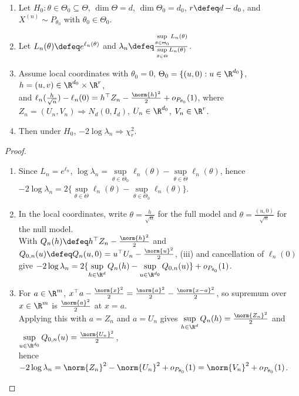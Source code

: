 \begin{theorem} \label{thm:wilks-likelihood-ratio-chi-square} 
\begin{enumerate}[label=(\roman*)]
\setlength{\itemsep}{0pt}
\item Let $H_0:\theta\in\Theta_0\subseteq\Theta$, $\dim\Theta=d$, $\dim\Theta_0=d_0$, $r\defeq d-d_0$, and $X^{(n)}\sim P_{\theta_0}$ with $\theta_0\in\Theta_0$.
\item Let $L_n(\theta)\defeq e^{\ell_n(\theta)}$ and $\lambda_n\defeq\frac{\sup\limits_{\theta\in\Theta_0}L_n(\theta)}{\sup\limits_{\theta\in\Theta}L_n(\theta)}$.
\item Assume local coordinates with $\theta_0=0$, $\Theta_0=\{(u,0):u\in\R^{d_0}\}$, $h=(u,v)\in\R^{d_0}\times\R^r$,\\
and $\ell_n(\frac{h}{\sqrt n})-\ell_n(0)=h^\top Z_n-\frac{\norm{h}^2}{2}+o_{P_{\theta_0}}(1)$, where $Z_n=(U_n,V_n)\Rightarrow N_d(0,I_d)$, $U_n\in\R^{d_0}$, $V_n\in\R^r$.
\item
Then under $H_0$, $-2\log\lambda_n\Rightarrow\chi_r^2$.
\end{enumerate}
\begin{proof}
\begin{enumerate}[label=(\roman*)]
\setlength{\itemsep}{0pt}
\item Since $L_n=e^{\ell_n}$, $\log\lambda_n=\sup\limits_{\theta\in\Theta_0}\ell_n(\theta)-\sup\limits_{\theta\in\Theta}\ell_n(\theta)$, hence $-2\log\lambda_n=2\{\sup\limits_{\theta\in\Theta}\ell_n(\theta)-\sup\limits_{\theta\in\Theta_0}\ell_n(\theta)\}$.
\item In the local coordinates, write $\theta=\frac{h}{\sqrt n}$ for the full model and $\theta=\frac{(u,0)}{\sqrt n}$ for the null model.\\
With $Q_n(h)\defeq h^\top Z_n-\frac{\norm{h}^2}{2}$ and $Q_{0,n}(u)\defeq Q_n(u,0)=u^\top U_n-\frac{\norm{u}^2}{2}$, (iii) and cancellation of $\ell_n(0)$ give $-2\log\lambda_n=2\{\sup\limits_{h\in\R^d}Q_n(h)-\sup\limits_{u\in\R^{d_0}}Q_{0,n}(u)\}+o_{P_{\theta_0}}(1)$.
\item For $a\in\R^m$, $x^\top a-\frac{\norm{x}^2}{2}=\frac{\norm{a}^2}{2}-\frac{\norm{x-a}^2}{2}$, so supremum over $x\in\R^m$ is $\frac{\norm{a}^2}{2}$ at $x=a$.\\
Applying this with $a=Z_n$ and $a=U_n$ gives $\sup\limits_{h\in\R^d}Q_n(h)=\frac{\norm{Z_n}^2}{2}$ and $\sup\limits_{u\in\R^{d_0}}Q_{0,n}(u)=\frac{\norm{U_n}^2}{2}$,\\
hence $-2\log\lambda_n=\norm{Z_n}^2-\norm{U_n}^2+o_{P_{\theta_0}}(1)=\norm{V_n}^2+o_{P_{\theta_0}}(1)$.

\end{enumerate}
\end{proof}
\end{theorem}
